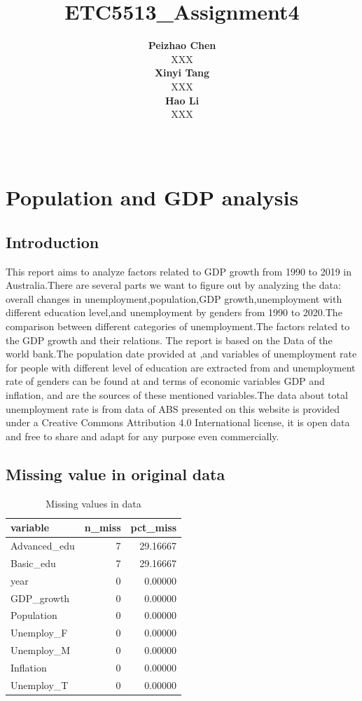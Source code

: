 \documentclass[11pt,a4paper,]{article}
\title{ETC5513\_Assignment4}
\author{\sf\Large\textbf{ Peizhao Chen}\\ {\sf\large XXX\\[0.5cm]} \sf\Large\textbf{ Xinyi Tang}\\ {\sf\large XXX\\[0.5cm]} \sf\Large\textbf{ Hao Li}\\ {\sf\large XXX\\[0.5cm]}}
\date{\sf\Date~\Month~\Year}
\makeatletter
\def\titlepage{\front{\expandafter{\@title}}{\@author}{\@organization}}
\makeatother
\begin{document}
\titlepage

\section{Population and GDP analysis}

\subsection{Introduction}

This report aims to analyze factors related to GDP growth from 1990 to 2019 in Australia.There are several parts we want to figure out by analyzing the data: overall changes in unemployment,population,GDP growth,unemployment with different education level,and unemployment by genders from 1990 to 2020.The comparison between different categories of unemployment.The factors related to the GDP growth and their relations.
The report is based on the Data of the world bank.The population date provided at \textcite{Population},and variables of unemployment rate for people with different level of education are extracted from \textcite{basiceducation} and \textcite{advancededucation.Similarly} unemployment rate of genders can be found at \textcite{femaleunemployment} and \textcite{maleunemploymen.In} terms of economic variables GDP and inflation,\textcite{GDP} and \textcite{inflation} are the sources of these mentioned variables.The data about total unemployment rate is from \textcite{totalunemployment.All} data of ABS presented on this website is provided under a Creative Commons Attribution 4.0 International license, it is open data and free to share and adapt for any purpose even commercially.

\subsection{Missing value in original data}

\begin{table}[H]

\caption{\label{tab:m1}Missing values in data}
\centering
\begin{tabular}[t]{lrr}
\toprule
variable & n\_miss & pct\_miss\\
\midrule
Advanced\_edu & 7 & 29.16667\\
Basic\_edu & 7 & 29.16667\\
year & 0 & 0.00000\\
GDP\_growth & 0 & 0.00000\\
Population & 0 & 0.00000\\
\addlinespace
Unemploy\_F & 0 & 0.00000\\
Unemploy\_M & 0 & 0.00000\\
Inflation & 0 & 0.00000\\
Unemploy\_T & 0 & 0.00000\\
\bottomrule
\end{tabular}
\end{table}
\end{document}
